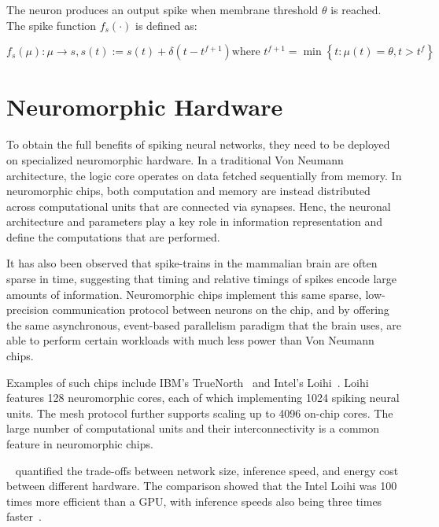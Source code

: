 \documentclass[fyp]{socreport}
\begin{document}
The neuron produces an output spike when membrane threshold $\theta$ is
reached. The spike function $f_{s}(\cdot)$ is defined as:

\begin{equation}
  \label{eq:slayer_spike_fn}
  f_{s}(\mu) : \mu \rightarrow s, s(t) := s(t) + \delta(t - t^{f+1}) \text{
    where } t^{f+1} = \min \left\{t: \mu(t) = \theta, t > t^{f}\right\}
\end{equation}

\section{Neuromorphic Hardware\label{neuromorphic}}

To obtain the full benefits of spiking neural networks, they need to be deployed
on specialized neuromorphic hardware. In a traditional Von Neumann architecture,
the logic core operates on data fetched sequentially from memory. In
neuromorphic chips, both computation and memory are instead distributed across
computational units that are connected via synapses. Henc, the neuronal
architecture and parameters play a key role in information representation and
define the computations that are performed.

It has also been observed that spike-trains in the mammalian brain are often
sparse in time, suggesting that timing and relative timings of spikes encode
large amounts of information. Neuromorphic chips implement this same sparse,
low-precision communication protocol between neurons on the chip, and by
offering the same asynchronous, event-based parallelism paradigm that the brain
uses, are able to perform certain workloads with much less power than Von
Neumann chips.

Examples of such chips include IBM's TrueNorth~\cite{Merolla668} and Intel's
Loihi~\cite{davies2018loihi}. Loihi features 128 neuromorphic cores, each of
which implementing 1024 spiking neural units. The mesh protocol further supports
scaling up to 4096 on-chip cores. The large number of computational units and
their interconnectivity is a common feature in neuromorphic chips.

~\citeauthor{blouw18_bench_keywor_spott_effic_neurom_hardw} quantified the
trade-offs between network size, inference speed, and energy cost between
different hardware. The comparison showed that the Intel Loihi was 100 times
more efficient than a GPU, with inference speeds also being three times
faster~\cite{blouw18_bench_keywor_spott_effic_neurom_hardw}.
\end{document}
